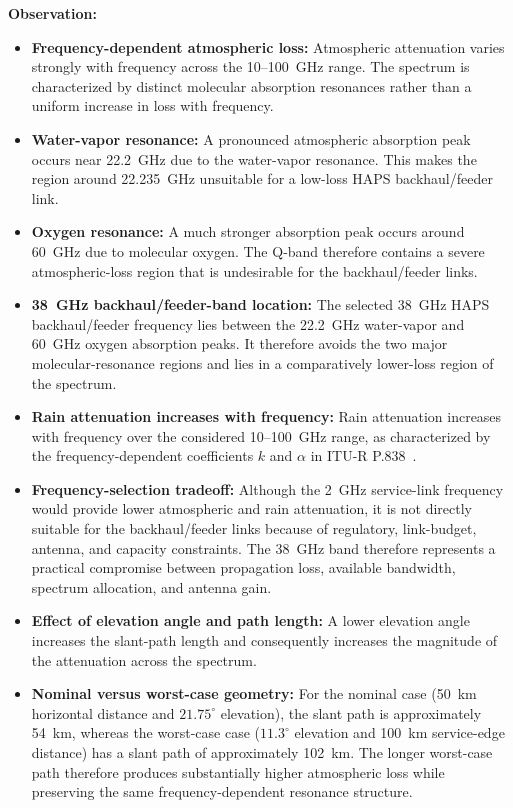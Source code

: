 \documentclass[conference]{IEEEtran}
\begin{document}
\textbf{Observation:}
\begin{itemize}
    \item \textbf{Frequency-dependent atmospheric loss:}
    Atmospheric attenuation varies strongly with frequency across the 10--100~GHz range. The spectrum is characterized by distinct molecular absorption resonances rather than a uniform increase in loss with frequency.

    \item \textbf{Water-vapor resonance:}
    A pronounced atmospheric absorption peak occurs near 22.2~GHz due to the water-vapor resonance. This makes the region around 22.235~GHz unsuitable for a low-loss HAPS backhaul/feeder link.

    \item \textbf{Oxygen resonance:}
    A much stronger absorption peak occurs around 60~GHz due to molecular oxygen. The Q-band therefore contains a severe atmospheric-loss region that is undesirable for the backhaul/feeder links.

    \item \textbf{38~GHz backhaul/feeder-band location:}
    The selected 38~GHz HAPS backhaul/feeder frequency lies between the 22.2~GHz water-vapor and 60~GHz oxygen absorption peaks. It therefore avoids the two major molecular-resonance regions and lies in a comparatively lower-loss region of the spectrum.

    \item \textbf{Rain attenuation increases with frequency:}
    Rain attenuation increases with frequency over the considered 10--100~GHz range, as characterized by the frequency-dependent coefficients $k$ and $\alpha$ in ITU-R P.838~\cite{itu_p838}.

    \item \textbf{Frequency-selection tradeoff:}
    Although the 2~GHz service-link frequency would provide lower atmospheric and rain attenuation, it is not directly suitable for the backhaul/feeder links because of regulatory, link-budget, antenna, and capacity constraints. The 38~GHz band therefore represents a practical compromise between propagation loss, available bandwidth, spectrum allocation, and antenna gain.

    \item \textbf{Effect of elevation angle and path length:}
    A lower elevation angle increases the slant-path length and consequently increases the magnitude of the attenuation across the spectrum.

    \item \textbf{Nominal versus worst-case geometry:}
    For the nominal case (50~km horizontal distance and $21.75^\circ$ elevation), the slant path is approximately 54~km, whereas the worst-case case ($11.3^\circ$ elevation and 100~km service-edge distance) has a slant path of approximately 102~km. The longer worst-case path therefore produces substantially higher atmospheric loss while preserving the same frequency-dependent resonance structure.


\end{itemize}
\end{document}
